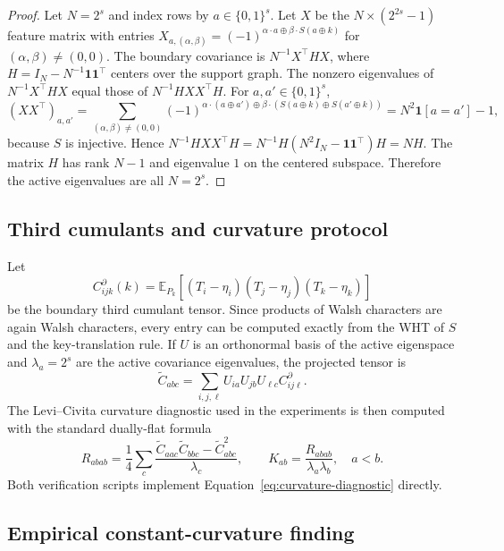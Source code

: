 \documentclass[referee,lineno,pdflatex,sn-mathphys-num]{sn-jnl}
\theoremstyle{thmstylethree}
\theoremstyle{thmstyletwo}
\theoremstyle{thmstyleone}
\newcommand{\B}[1]{\{0,1\}^{#1}}
\begin{document}
\begin{proof}
Let $N=2^s$ and index rows by $a\in\B{s}$.  Let $X$ be the $N\times(2^{2s}-1)$
feature matrix with entries
$X_{a,(\alpha,\beta)}=(-1)^{\alpha\cdot a\oplus\beta\cdot S(a\oplus k)}$ for
$(\alpha,
\beta)\neq(0,0)$.  The boundary covariance is
$N^{-1}X^\top H X$, where $H=I_N-N^{-1}\mathbf 1\mathbf 1^\top$ centers over the
support graph.  The nonzero eigenvalues of $N^{-1}X^\top H X$ equal those of
$N^{-1}HXX^\top H$.  For $a,a'\in\B{s}$,
\[
 (XX^\top)_{a,a'}=
 \sum_{(\alpha,\beta)\neq(0,0)}
 (-1)^{\alpha\cdot(a\oplus a')\oplus
 \beta\cdot(S(a\oplus k)\oplus S(a'\oplus k))}
 =N^2\mathbf 1[a=a']-1,
\]
because $S$ is injective.  Hence
$N^{-1}HXX^\top H=N^{-1}H(N^2I_N-\mathbf 1\mathbf 1^\top)H=NH$.
The matrix $H$ has rank $N-1$ and eigenvalue $1$ on the centered subspace.
Therefore the active eigenvalues are all $N=2^s$.
\end{proof}

\subsection{Third cumulants and curvature protocol}\label{subsec:third-cum}

Let
\begin{equation}\label{eq:third-cumulant}
  C^{\partial}_{ijk}(k)=
  \mathbb E_{P_k}\left[(T_i-\eta_i)(T_j-\eta_j)(T_k-\eta_k)\right]
\end{equation}
be the boundary third cumulant tensor.  Since products of Walsh characters are
again Walsh characters, every entry can be computed exactly from the WHT of
$S$ and the key-translation rule.  If $U$ is an orthonormal basis of the active
eigenspace and $\lambda_a=2^s$ are the active covariance eigenvalues, the
projected tensor is
\begin{equation}\label{eq:projected-cumulant}
  \widetilde C_{abc}=\sum_{i,j,\ell}U_{ia}U_{jb}U_{\ell c}C^{\partial}_{ij\ell}.
\end{equation}
The Levi--Civita curvature diagnostic used in the experiments is then computed
with the standard dually-flat formula
\begin{equation}\label{eq:curvature-diagnostic}
  R_{abab}=\frac14\sum_c
  \frac{\widetilde C_{aac}\widetilde C_{bbc}-\widetilde C_{abc}^2}{\lambda_c},
  \qquad
  K_{ab}=\frac{R_{abab}}{\lambda_a\lambda_b},\quad a<b.
\end{equation}
Both verification scripts implement
Equation~\eqref{eq:curvature-diagnostic} directly.

\subsection{Empirical constant-curvature finding}\label{subsec:empirical-curv}
\end{document}
